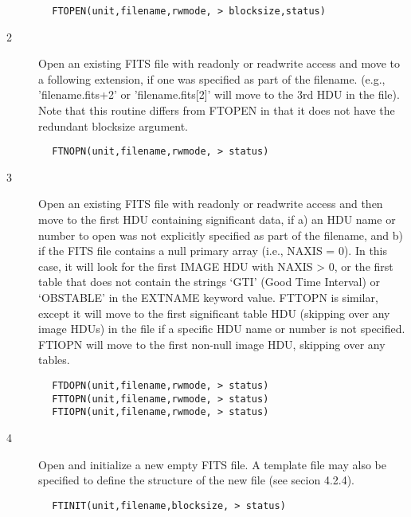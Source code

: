 \documentclass[11pt]{book}
\begin{document}
\begin{verbatim}
        FTOPEN(unit,filename,rwmode, > blocksize,status)
\end{verbatim}

\begin{description}
\item[2 ]Open an existing FITS file with readonly or readwrite access
   and move to a following extension, if one was specified as
   part of the filename.  (e.g.,  'filename.fits+2' or
   'filename.fits[2]' will move to the 3rd HDU in the file).
   Note that this routine differs from FTOPEN in that it does not
  have the redundant blocksize argument.
\end{description}

\begin{verbatim}
        FTNOPN(unit,filename,rwmode, > status)
\end{verbatim}

\begin{description}
\item[3 ]Open an existing FITS file with readonly or readwrite access
   and then move to the first HDU containing significant data, if a) an HDU
   name or number to open was not explicitly specified as part of the
   filename, and b) if the FITS file contains a null primary array (i.e.,
   NAXIS = 0).  In this case, it will look for the first IMAGE HDU with
   NAXIS > 0, or the first table that does not contain the strings `GTI'
   (Good Time Interval) or `OBSTABLE' in the EXTNAME keyword value.  FTTOPN
   is similar, except it will move to the first significant table HDU
   (skipping over any image HDUs) in the file if a specific HDU name
   or number is not specified.  FTIOPN will move to the first non-null
  image HDU, skipping over any tables.
\end{description}

\begin{verbatim}
        FTDOPN(unit,filename,rwmode, > status)
        FTTOPN(unit,filename,rwmode, > status)
        FTIOPN(unit,filename,rwmode, > status)
\end{verbatim}

\begin{description}
\item[4 ]Open and initialize a new empty FITS file.   A template file may also be
   specified to define the structure of the new file (see secion 4.2.4).
\end{description}

\begin{verbatim}
        FTINIT(unit,filename,blocksize, > status)
\end{verbatim}
\end{document}
